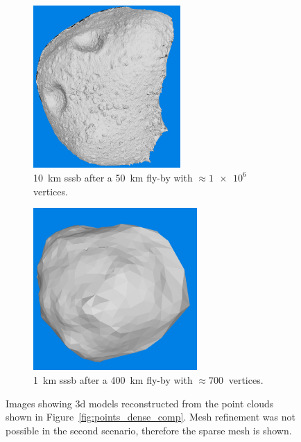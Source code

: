 \begin{figure}[htb]
    \centering
        \begin{subfigure}[b]{0.42\textwidth}
            \centering
            \includegraphics[width=\textwidth,height=6.2cm]{doc/thesis/0_figures/models_quality/50_10/120_50_10_refine2.png}
            \caption{\SI{10}{\kilo\meter} \gls{sssb} after a \SI{50}{\kilo\meter} fly-by with $\approx\SI{1e6}{}$ vertices.} %
            \label{fig:models_50_10}
        \end{subfigure}
        \begin{subfigure}[b]{0.42\textwidth}
            \centering
            \includegraphics[width=\textwidth,height=6.2cm]{doc/thesis/0_figures/models_quality/400_1/120_400_1_mesh2.png}
            \caption{\SI{1}{\kilo\meter} \gls{sssb} after a \SI{400}{\kilo\meter} fly-by with $\approx\SI{700}{}$ vertices.}
            \label{fig:models_400_1}
        \end{subfigure}
    \caption{Images showing \gls{3d} models reconstructed from the point clouds shown in Figure~\ref{fig:points_dense_comp}. Mesh refinement was not possible in the second scenario, therefore the sparse mesh is shown.}
    \label{fig:models_comp}
\end{figure}

